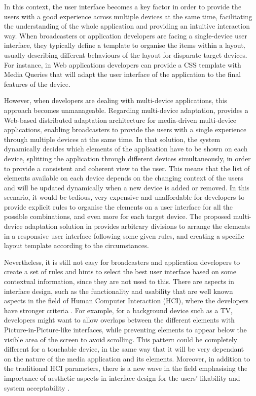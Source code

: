 In this context, the user interface becomes a key factor in order to provide the users with a good experience across multiple devices at the same time, facilitating the understanding of the whole application and providing an intuitive interaction way. When broadcasters or application developers are facing a single-device user interface, they typically define a template to organise the items within a layout, usually describing different behaviours of the layout for disparate target devices. For instance, in Web applications developers can provide a CSS template with Media Queries that will adapt the user interface of the application to the final features of the device.

However, when developers are dealing with multi-device applications, this approach becomes unmanageable. Regarding multi-device adaptation, \cite{Zorrilla2015} provides a Web-based distributed adaptation architecture for media-driven multi-device applications, enabling broadcasters to provide the users with a single experience through multiple devices at the same time. In that solution, the system dynamically decides which elements of the application have to be shown on each device, splitting the application through different devices simultaneously, in order to provide a consistent and coherent view to the user. This means that the list of elements available on each device depends on the changing context of the users and will be updated dynamically when a new device is added or removed. In this scenario, it would be tedious, very expensive and unaffordable for developers to provide explicit rules to organise the elements on a user interface for all the possible combinations, and even more for each target device. The proposed multi-device adaptation solution in \cite{Zorrilla2015} provides arbitrary divisions to arrange the elements in a responsive user interface following some given rules, and creating a specific layout template according to the circumstances.

Nevertheless, it is still not easy for broadcasters and application developers to create a set of rules and hints to select the best user interface based on some contextual information, since they are not used to this. There are aspects in interface design, such as the functionality and usability that are well known aspects in the field of Human Computer Interaction (HCI), where the developers have stronger criteria \cite{mcnamara2006functionality}. For example, for a background device such as a TV, developers might want to allow overlaps between the different elements with Picture-in-Picture-like interfaces, while preventing elements to appear below the visible area of the screen to avoid scrolling. This pattern could be completely different for a touchable device, in the same way that it will be very dependant on the nature of the media application and its elements. Moreover, in addition to the traditional HCI parameters, there is a new wave in the field emphasising the importance of aesthetic aspects in interface design for the users’ likability and system acceptability \cite{bauerly2008effects} \cite{altaboli2011investigating}.

